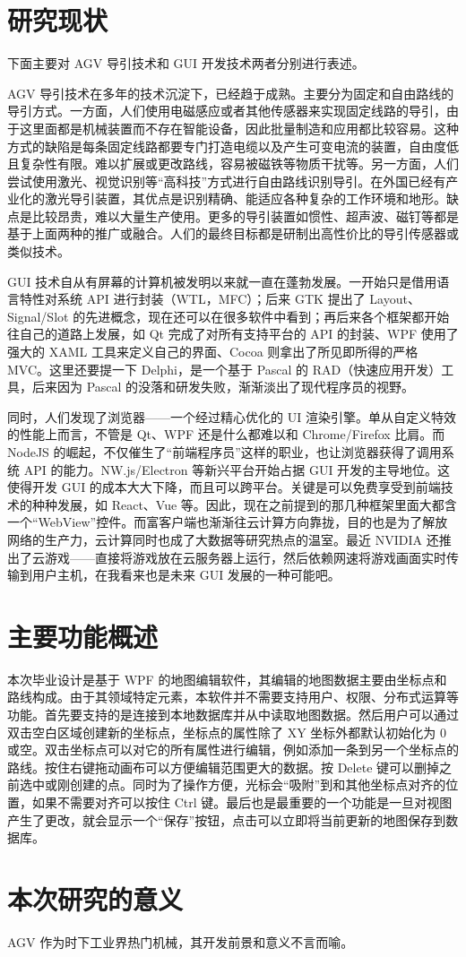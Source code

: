 \section{研究现状}

下面主要对 AGV 导引技术和 GUI 开发技术两者分别进行表述。

AGV 导引技术在多年的技术沉淀下，已经趋于成熟。主要分为固定和自由路线的导引方式。一方面，人们使用电磁感应或者其他传感器来实现固定线路的导引，由于这里面都是机械装置而不存在智能设备，因此批量制造和应用都比较容易。这种方式的缺陷是每条固定线路都要专门打造电缆以及产生可变电流的装置，自由度低且复杂性有限。难以扩展或更改路线，容易被磁铁等物质干扰等。另一方面，人们尝试使用激光、视觉识别等``高科技''方式进行自由路线识别导引。在外国已经有产业化的激光导引装置，其优点是识别精确、能适应各种复杂的工作环境和地形。缺点是比较昂贵，难以大量生产使用。更多的导引装置如惯性、超声波、磁钉等都是基于上面两种的推广或融合。人们的最终目标都是研制出高性价比的导引传感器或类似技术。

GUI 技术自从有屏幕的计算机被发明以来就一直在蓬勃发展。一开始只是借用语言特性对系统 API 进行封装（WTL，MFC）；后来 GTK 提出了 Layout、Signal/Slot 的先进概念，现在还可以在很多软件中看到；再后来各个框架都开始往自己的道路上发展，如 Qt 完成了对所有支持平台的 API 的封装、WPF 使用了强大的 XAML 工具来定义自己的界面、Cocoa 则拿出了所见即所得的严格 MVC。这里还要提一下 Delphi，是一个基于 Pascal 的 RAD（快速应用开发）工具，后来因为 Pascal 的没落和研发失败，渐渐淡出了现代程序员的视野。

同时，人们发现了浏览器——一个经过精心优化的 UI 渲染引擎。单从自定义特效的性能上而言，不管是 Qt、WPF 还是什么都难以和 Chrome/Firefox 比肩。而 NodeJS 的崛起，不仅催生了``前端程序员''这样的职业，也让浏览器获得了调用系统 API 的能力。NW.js/Electron 等新兴平台开始占据 GUI 开发的主导地位。这使得开发 GUI 的成本大大下降，而且可以跨平台。关键是可以免费享受到前端技术的种种发展，如 React、Vue 等。因此，现在之前提到的那几种框架里面大都含一个``WebView''控件。而富客户端也渐渐往云计算方向靠拢，目的也是为了解放网络的生产力，云计算同时也成了大数据等研究热点的温室。最近 NVIDIA 还推出了云游戏——直接将游戏放在云服务器上运行，然后依赖网速将游戏画面实时传输到用户主机，在我看来也是未来 GUI 发展的一种可能吧。

\section{主要功能概述}

本次毕业设计是基于 WPF 的地图编辑软件，其编辑的地图数据主要由坐标点和路线构成。由于其领域特定元素，本软件并不需要支持用户、权限、分布式运算等功能。首先要支持的是连接到本地数据库并从中读取地图数据。然后用户可以通过双击空白区域创建新的坐标点，坐标点的属性除了 XY 坐标外都默认初始化为 0 或空。双击坐标点可以对它的所有属性进行编辑，例如添加一条到另一个坐标点的路线。按住右键拖动画布可以方便编辑范围更大的数据。按 Delete 键可以删掉之前选中或刚创建的点。同时为了操作方便，光标会``吸附''到和其他坐标点对齐的位置，如果不需要对齐可以按住 Ctrl 键。最后也是最重要的一个功能是一旦对视图产生了更改，就会显示一个``保存''按钮，点击可以立即将当前更新的地图保存到数据库。

\section{本次研究的意义}

AGV 作为时下工业界热门机械，其开发前景和意义不言而喻。
